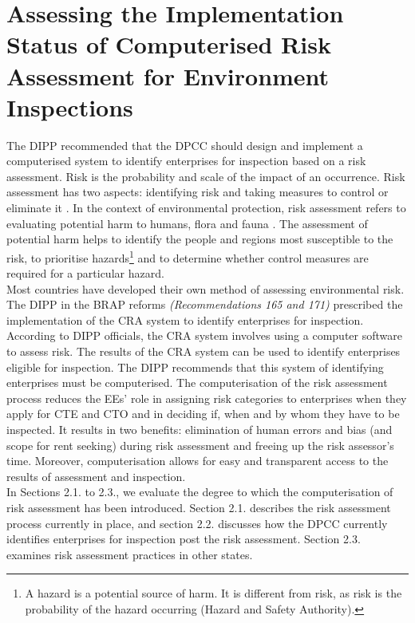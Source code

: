 \documentclass[a4paper, 12pt, twoside]{article}
\begin{document}
                 \section{Assessing the Implementation Status of Computerised Risk Assessment for Environment Inspections}\label{sec:1} 
                 
                 The DIPP recommended that the DPCC should design and implement a computerised system to identify enterprises for inspection based on a risk assessment. Risk is the probability and scale of the impact of an occurrence. Risk assessment has two aspects: identifying risk and taking measures to control or eliminate it \parencite{Stoneburner}. In the context of environmental protection, risk assessment refers to evaluating potential harm to humans, flora and fauna \parencite{EPAnd}. The assessment of potential harm helps to identify the people and regions most susceptible to the risk, to prioritise hazards\footnote{A hazard is a potential source of harm. It is different from risk, as risk is the probability of the hazard occurring (Hazard and Safety Authority).} and to determine whether control measures are required for a particular hazard. \\
                 
                 Most countries have developed their own method of assessing environmental risk. The DIPP in the BRAP reforms \textit{(Recommendations 165 and 171)} prescribed the implementation of the CRA system to identify enterprises for inspection. \\ 
                 
                 According to DIPP officials, the CRA system involves using a computer software to assess risk. The results of the CRA system can be used to identify enterprises eligible for inspection. The DIPP recommends that this system of identifying enterprises must be computerised. The computerisation of the risk assessment process reduces the EEs’ role in assigning risk categories to enterprises when they apply for CTE and CTO and in deciding if, when and by whom they have to be inspected. It results in two benefits: elimination of human errors and bias (and scope for rent seeking) during  risk assessment and freeing up the risk assessor’s time. Moreover, computerisation allows for easy and transparent access to the results of assessment and inspection. \\
                 
                 In Sections 2.1. to 2.3., we evaluate the degree to which the computerisation of risk assessment has been introduced. Section 2.1. describes the risk assessment process currently in place, and section 2.2. discusses how the DPCC currently identifies enterprises for inspection post the risk assessment. Section 2.3. examines risk assessment practices in other states. 
                                  
\end{document}
